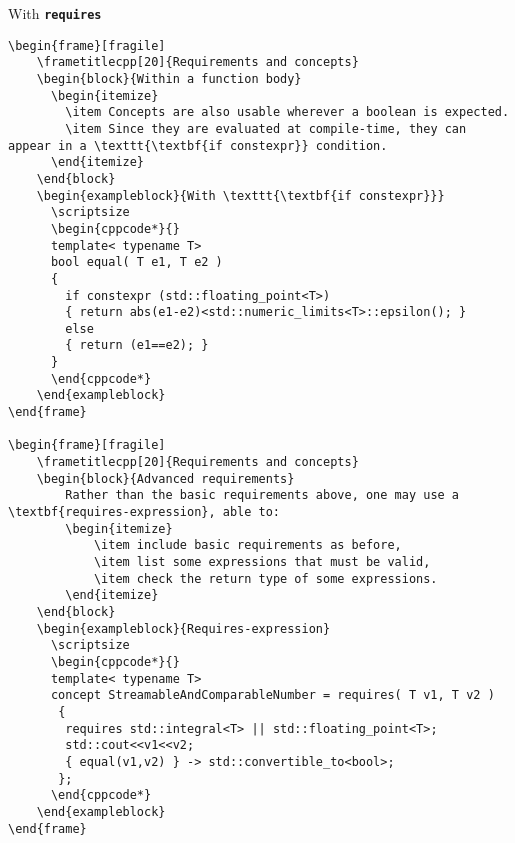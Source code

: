 \begin{frame}[fragile]
\begin{exampleblock}{With \texttt{\textbf{requires}}}
\begin{verbatim}
\begin{frame}[fragile]
    \frametitlecpp[20]{Requirements and concepts}
    \begin{block}{Within a function body}
      \begin{itemize}
        \item Concepts are also usable wherever a boolean is expected.
        \item Since they are evaluated at compile-time, they can appear in a \texttt{\textbf{if constexpr}} condition.
      \end{itemize}
    \end{block}
    \begin{exampleblock}{With \texttt{\textbf{if constexpr}}}
      \scriptsize
      \begin{cppcode*}{}
      template< typename T>
      bool equal( T e1, T e2 )
      {
        if constexpr (std::floating_point<T>)
        { return abs(e1-e2)<std::numeric_limits<T>::epsilon(); }
        else
        { return (e1==e2); }
      }
      \end{cppcode*}
    \end{exampleblock}
\end{frame}

\begin{frame}[fragile]
    \frametitlecpp[20]{Requirements and concepts}
    \begin{block}{Advanced requirements}
        Rather than the basic requirements above, one may use a \textbf{requires-expression}, able to:
        \begin{itemize}
            \item include basic requirements as before,
            \item list some expressions that must be valid,
            \item check the return type of some expressions.
        \end{itemize}
    \end{block}
    \begin{exampleblock}{Requires-expression}
      \scriptsize
      \begin{cppcode*}{}
      template< typename T>
      concept StreamableAndComparableNumber = requires( T v1, T v2 )
       {
        requires std::integral<T> || std::floating_point<T>;
        std::cout<<v1<<v2;
        { equal(v1,v2) } -> std::convertible_to<bool>;
       };
      \end{cppcode*}
    \end{exampleblock}
\end{frame}


\end{verbatim}
\end{exampleblock}
\end{frame}
